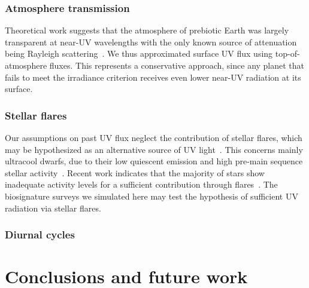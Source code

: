 \documentclass[modern,linenumbers]{aastex631}
\begin{document}
\subsubsection{Atmosphere transmission}
Theoretical work suggests that the atmosphere of prebiotic Earth was largely transparent at near-UV wavelengths with the only known source of attenuation being Rayleigh scattering~\citep{Ranjan2017,Ranjan2017c}.
We thus approximated surface UV flux using top-of-atmosphere fluxes.
This represents a conservative approach, since any planet that fails to meet the irradiance criterion receives even lower near-UV radiation at its surface. 

\subsubsection{Stellar flares}
Our assumptions on past UV flux neglect the contribution of stellar flares, which may be hypothesized as an alternative source of UV light~\citep{Ranjan2017}.
This concerns mainly ultracool dwarfs, due to their low quiescent emission and high pre-main sequence stellar activity~\citep{Buccino2007,West2008}.
Recent work indicates that the majority of stars show inadequate activity levels for a sufficient contribution through flares~\citep{Glazier2020,Ducrot2020,Guenther2020}.
The biosignature surveys we simulated here may test the hypothesis of sufficient UV radiation via stellar flares.

\subsubsection{Diurnal cycles}


\section{Conclusions and future work}
\end{document}
